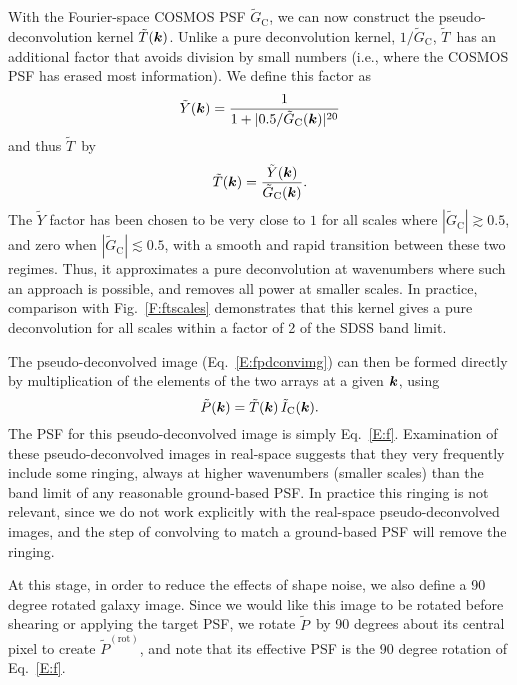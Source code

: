 \documentclass[twocolumn,useAMS,usenatbib]{mn2e}
\newcommand{\beq}{\begin{equation}}
\newcommand{\eeq}{\end{equation}}
\newcommand{\tic}{\ensuremath{\tilde{I}_\mathrm{C}}}
\newcommand{\tpc}{\ensuremath{\tilde{G}_\mathrm{C}}}
\newcommand{\tkpd}{\ensuremath{\tilde{T}}}
\newcommand{\ticpd}{\ensuremath{\tilde{P}}}
\newcommand{\ticpdr}{\ensuremath{\tilde{P}^\mathrm{(rot)}}}
\begin{document}
With the Fourier-space COSMOS PSF \tpc, we can now construct the
pseudo-deconvolution kernel $\tkpd({\bmath k})$.  Unlike a pure deconvolution
kernel, $1/\tpc$, \tkpd\ has an additional factor that avoids division
by small numbers (i.e., where the COSMOS PSF has erased most
information).  We define this factor as
\beq\label{E:f}
\tilde{Y}({\bmath k})= \frac{1}{1 + |0.5/\tpc({\bmath k})|^{20}}
\eeq
and thus \tkpd\ by  
\beq\label{E:pdkern}
\tkpd({\bmath k}) =  \frac{\tilde{Y}({\bmath k})}{\tpc({\bmath k})}.  
\eeq 
The $\tilde{Y}$ factor has been chosen to be very close to $1$ for all
scales where $|\tpc| \gtrsim 0.5$,
and zero when $|\tpc| \lesssim 0.5$, with a smooth and rapid
transition between these two regimes.  Thus, it approximates a pure
deconvolution at wavenumbers where such an approach is possible, and
removes all power at smaller scales.  In practice, comparison with
Fig.~\ref{F:ftscales} demonstrates that this kernel gives a pure
deconvolution for all scales within a factor of 2 of the SDSS band
limit. 

The pseudo-deconvolved image (Eq.~\ref{E:fpdconvimg}) can then be formed directly by 
multiplication of the elements of the two arrays at a given ${\bmath k}$, using
\beq
\ticpd({\bmath k}) = \tkpd({\bmath k}) \,\tic({\bmath k}).
\eeq
The PSF for this pseudo-deconvolved image is simply Eq.~\eqref{E:f}.
Examination of these pseudo-deconvolved images in real-space suggests
that they very frequently include some ringing, always at higher
wavenumbers (smaller scales) than the band limit of any reasonable
ground-based PSF.  In practice this ringing is not relevant, since we
do not work explicitly with the real-space pseudo-deconvolved images,
and the step of convolving to match a ground-based PSF will remove 
the ringing. 

At this stage, in order to reduce the effects of shape noise, we also
define a 90 degree rotated galaxy image.  Since we would like this
image to be rotated before shearing or applying the target PSF, we
rotate \ticpd\ by 90 degrees about its central pixel to create
\ticpdr, and note that its effective PSF is the 90 degree rotation of
Eq.~\eqref{E:f}.  
\end{document}
